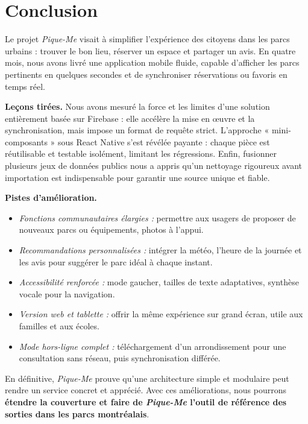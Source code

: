\documentclass[12pt,a4paper]{article}
\begin{document}
\medskip\noindent

\clearpage
\section{Conclusion}

Le projet \textit{Pique-Me} visait à simplifier l'expérience des citoyens dans les parcs urbains : trouver le bon lieu, réserver un espace et partager un avis. En quatre mois, nous avons livré une application mobile fluide, capable d'afficher les parcs pertinents en quelques secondes et de synchroniser réservations ou favoris en temps réel. 

\medskip\noindent
\textbf{Leçons tirées.}  
Nous avons mesuré la force et les limites d'une solution entièrement basée sur Firebase : elle accélère la mise en œuvre et la synchronisation, mais impose un format de requête strict. L'approche « mini-composants » sous React Native s'est révélée payante : chaque pièce est réutilisable et testable isolément, limitant les régressions. Enfin, fusionner plusieurs jeux de données publics nous a appris qu'un nettoyage rigoureux avant importation est indispensable pour garantir une source unique et fiable.

\medskip\noindent
\textbf{Pistes d'amélioration.}  
\begin{itemize}
  \item \emph{Fonctions communautaires élargies :} permettre aux usagers de proposer de nouveaux parcs ou équipements, photos à l'appui.
  \item \emph{Recommandations personnalisées :} intégrer la météo, l'heure de la journée et les avis pour suggérer le parc idéal à chaque instant.
  \item \emph{Accessibilité renforcée :} mode gaucher, tailles de texte adaptatives, synthèse vocale pour la navigation.
  \item \emph{Version web et tablette :} offrir la même expérience sur grand écran, utile aux familles et aux écoles.
  \item \emph{Mode hors-ligne complet :} téléchargement d'un arrondissement pour une consultation sans réseau, puis synchronisation différée.
\end{itemize}

\medskip\noindent
En définitive, \textit{Pique-Me} prouve qu'une architecture simple et modulaire peut rendre un service concret et apprécié. Avec ces améliorations, nous pourrons \textbf{étendre la couverture et faire de \textit{Pique-Me} l'outil de référence des sorties dans les parcs montréalais}.
\end{document}
